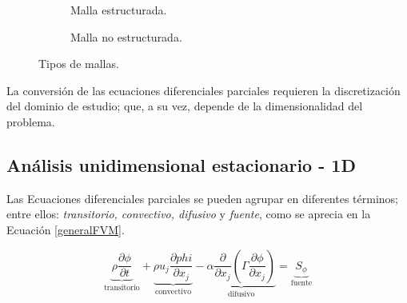 \begin{figure}[h!]
	\centering
	\begin{subfigure}[b]{0.48\textwidth}
		\centering
		\begin{adjustbox}{max width = \textwidth}
		\end{adjustbox}
		\caption{Malla estructurada.}
	\end{subfigure}
	\hfill
	\begin{subfigure}[b]{0.5\textwidth}
		\centering
		\begin{adjustbox}{max width = \textwidth}
		\end{adjustbox}
	\caption{Malla no estructurada.}
	\end{subfigure}
	\caption{Tipos de mallas.}
	\label{mallas}
\end{figure}

\noindent
\justify

La conversi\'on de las ecuaciones diferenciales parciales requieren la discretizaci\'on del dominio de estudio; que, a su vez, depende de la dimensionalidad del problema.

\subsection{An\'alisis unidimensional estacionario - 1D} \label{esta1D}

\noindent
\justify

Las Ecuaciones diferenciales parciales se pueden agrupar en diferentes t\'erminos; entre ellos: \textit{transitorio, convectivo, difusivo} y \textit{fuente}, como se aprecia en la Ecuaci\'on \ref{generalFVM}.

\begin{equation}
\underbrace{\rho \frac{\partial \phi}{\partial t}}_{\text{transitorio}} + \underbrace{\rho u_j \frac{\partial phi}{\partial x_j}}_{\text{convectivo}} - \underbrace{\alpha \frac{\partial}{\partial x_j} \left( \Gamma \frac{\partial \phi}{\partial x_j} \right)}_{\text{difusivo}} = \underbrace{S_{\phi}}_{\text{fuente}}
\label{generalFVM}
\end{equation}

